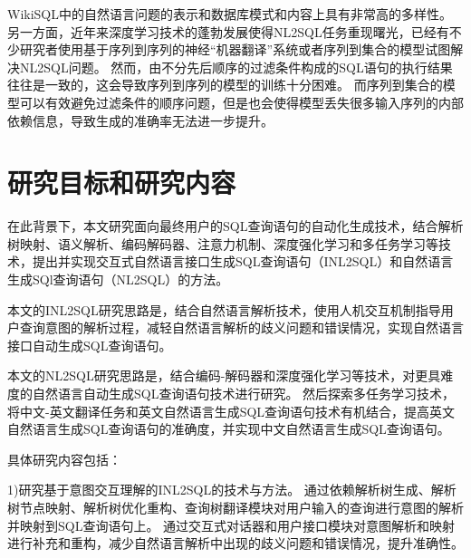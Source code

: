WikiSQL中的自然语言问题的表示和数据库模式和内容上具有非常高的多样性。
另一方面，近年来深度学习技术的蓬勃发展使得NL2SQL任务重现曙光，已经有不少研究者使用基于序列到序列的神经“机器翻译”系统\cite{zhong2017seq2sql,dong2016language}或者序列到集合的模型\cite{xu2017sqlnet,yu2018typesql}试图解决NL2SQL问题。
然而，由不分先后顺序的过滤条件构成的SQL语句的执行结果往往是一致的，这会导致序列到序列的模型的训练十分困难。
而序列到集合的模型可以有效避免过滤条件的顺序问题，但是也会使得模型丢失很多输入序列的内部依赖信息，导致生成的准确率无法进一步提升。


\section{研究目标和研究内容}
\label{intro:targetandcontent}
在此背景下，本文研究面向最终用户的SQL查询语句的自动化生成技术，结合解析树映射、语义解析、编码解码器、注意力机制、深度强化学习和多任务学习等技术，提出并实现交互式自然语言接口生成SQL查询语句（INL2SQL）和自然语言生成SQl查询语句（NL2SQL）的方法。

本文的INL2SQL研究思路是，结合自然语言解析技术，使用人机交互机制指导用户查询意图的解析过程，减轻自然语言解析的歧义问题和错误情况，实现自然语言接口自动生成SQL查询语句。

本文的NL2SQL研究思路是，结合编码-解码器和深度强化学习等技术，对更具难度的自然语言自动生成SQL查询语句技术进行研究。
然后探索多任务学习技术，将中文-英文翻译任务和英文自然语言生成SQL查询语句技术有机结合，提高英文自然语言生成SQL查询语句的准确度，并实现中文自然语言生成SQL查询语句。

具体研究内容包括：

1)研究基于意图交互理解的INL2SQL的技术与方法。
通过依赖解析树生成、解析树节点映射、解析树优化重构、查询树翻译模块对用户输入的查询进行意图的解析并映射到SQL查询语句上。
通过交互式对话器和用户接口模块对意图解析和映射进行补充和重构，减少自然语言解析中出现的歧义问题和错误情况，提升准确性。

